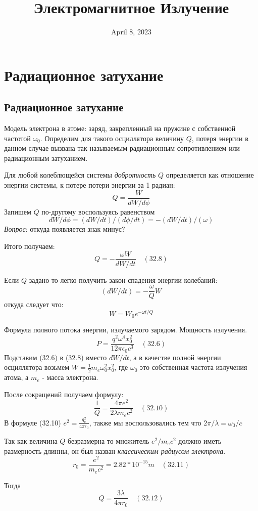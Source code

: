 \documentclass[12pt]{article}
\date{April 8, 2023}
\title{Электромагнитное Излучение}
\begin{document}
\maketitle

\tableofcontents

\newpage

\section{Радиационное затухание}

\subsection{Радиационное затухание}

Модель электрона в атоме: заряд, закрепленный на пружине с собственной частотой \(\omega_0\).
Определим для такого осциллятора величину \(Q\), потеря энергии в данном случае вызвана так называемым радиационным сопротивлением или радиационным затуханием.

Для любой колеблющейся системы \textit{добротность} \(Q\) определяется как отношение энергии системы, к потере потери энергии за 1 радиан:
\[
    Q = \frac{W}{dW/d\phi}
\]
Запишем \(Q\) по-другому воспользуясь равенством
\[
    dW/d\phi = (dW/dt)/(d\phi/dt) = -(dW/dt)/(\omega)
\] 
\textit{Вопрос}: откуда появляется знак минус?

\medskip

Итого получаем:
\[
    Q = - \frac{\omega W}{dW/dt} \quad (32.8)
\]

Если \(Q\) задано то легко получить закон спадения энергии колебаний:
\[
    (dW/dt) = - \frac{\omega}{Q} W
\]
откуда следует что:
\[
    W = W_0 e^{-\omega t/Q}
\]

\medskip

Формула полного потока энергии, излучаемого зарядом. Мощность излучения.
\[
    P = \frac{q^2 \omega^4 x_0^2 }{12 \pi \epsilon_0 c^3} \quad (32.6)
\] 
Подставим (32.6) в (32.8) вместо \(dW/dt\), а в качестве полной энергии осциллятора возьмем \(W=\frac{1}{2}m_e\omega_0^2x_0^2\), где \(\omega_0\) это собственная частота излучения атома, а \(m_e\) - масса электрона.

После сокращений получаем формулу:
\[
    \frac{1}{Q} =
    \frac
    {4 \pi e^2}
    {2 \lambda m_e c^2}
    \quad (32.10)
\]
В формуле (32.10) \(e^2=\frac{q_e^2}{4\pi\epsilon_0}\), также мы воспользовались тем что \(2\pi/\lambda=\omega_0/c\)

\medskip

Так как величина \(Q\) безразмерна то множитель \(e^{2}/m_{e}c^2\) должно иметь размерность длинны, он был назван \textit{классическим радиусом электрона}.
\[
    r_{0} =
    \frac
    {e^{2}}
    {m_{e}c^2}
    = 2.82*10^{-15} m
    \quad
    (32.11)
\]

Тогда
\[
    Q =
    \frac
    {3 \lambda}
    {4 \pi r_{0}}
    \quad
    (32.12)
\]
\end{document}
